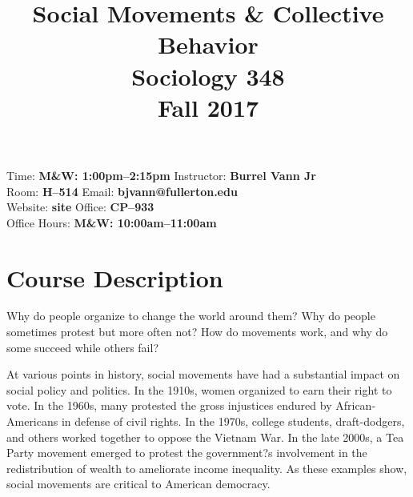 \documentclass[12pt]{article}
\begin{document}
\title{Social Movements \& Collective Behavior \\ Sociology 348 \\ Fall 2017 
}
\date{}
\maketitle

Time: \textbf{M\&W: 1:00pm--2:15pm} \hfill  \hfill Instructor: \textbf{Burrel Vann Jr} \\
Room: \textbf{H--514} \hfill  \hfill Email: \textbf{bjvann@fullerton.edu} \\
Website: \textbf{site} \hfill  \hfill Office: \textbf{CP--933} \\
  \hfill  \hfill Office Hours: \textbf{M\&W: 10:00am--11:00am} \\


\section*{Course Description}
Why do people organize to change the world around them? Why do people sometimes protest but more often not? How do movements work, and why do some succeed while others fail? \newline

At various points in history, social movements have had a substantial impact on social policy and politics. In the 1910s, women organized to earn their right to vote. In the 1960s, many protested the gross injustices endured by African-Americans in defense of civil rights. In the 1970s, college students, draft-dodgers, and others worked together to oppose the Vietnam War. In the late 2000s, a Tea Party movement emerged to protest the government?s involvement in the redistribution of wealth to ameliorate income inequality. As these examples show, social movements are critical to American democracy. \newline
\end{document}
